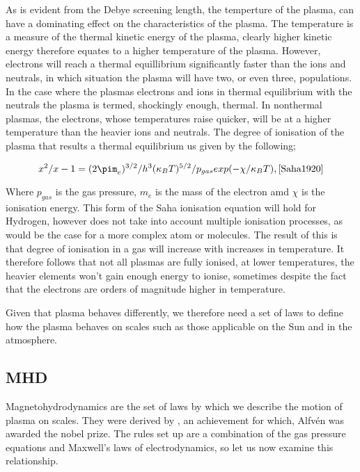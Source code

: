 As is evident from the Debye screening length, the temperture of the plasma, can have a dominating effect on the characteristics of the plasma.
The temperature is a measure of the thermal kinetic energy of the plasma, clearly higher kinetic energy therefore equates to a higher temperature of the plasma.
However, electrons will reach a thermal equillibrium significantly faster than the ions and neutrals, in which situation the plasma will have two, or even three, populations.
In the case where the plasmas electrons and ions in thermal equilibrium with the neutrals the plasma is termed, shockingly enough, thermal.
In nonthermal plasmas, the electrons, whose temperatures raise quicker, will be at a higher temperature than the heavier ions and neutrals.
The degree of ionisation of the plasma that results a thermal equilibrium us given by the following;

\begin{equation}
	x^2/{x - 1} = (2\pim_e)^{3/2}/h^3 (\kappa_BT)^{5/2}/p_{gas} exp(-{\chi/\kappa_BT}), \cite{Saha1920}
\end{equation}

Where $p_{gas}$ is the gas pressure, $m_e$ is the mass of the electron amd $\chi$ is the ionisation energy.
This form of the Saha ionisation equation will hold for Hydrogen, however does not take into account multiple ionisation processes, as would be the case for a more complex atom or molecules.
The result of this is that degree of ionisation in a gas will increase with increases in temperature.
It therefore follows that not all plasmas are fully ionised, at lower temperatures, the heavier elements won't gain enough energy to ionise, sometimes despite the fact that the electrons are orders of magnitude higher in temperature.

Given that plasma behaves differently, we therefore need a set of laws to define how the plasma behaves on scales such as those applicable on the Sun and in the atmosphere.


\subsection{MHD}

Magnetohydrodynamics are the set of laws by which we describe the motion of plasma on scales.
They were derived by \cite{Alfven1942}, an achievement for which, Alfv{\'e}n was awarded the nobel prize.	
The rules set up are a combination of the gas pressure equations and Maxwell's laws of electrodynamics, so let us now examine this relationship.

